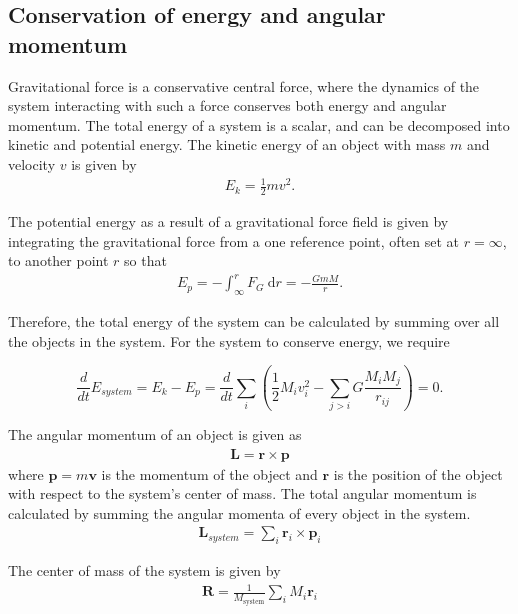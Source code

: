 \documentclass[a4paper]{article}
\begin{document}
\subsection{Conservation of energy and angular momentum}
\label{consE}
Gravitational force is a conservative central force, where the dynamics of the system interacting with such a force conserves both energy and angular momentum. The total energy of a system is a scalar, and can be decomposed into kinetic and potential energy. The kinetic energy of an object with mass $m$ and velocity $v$ is given by
\begin{align*}
 E_k = \frac{1}{2}m v^2.
\end{align*}

The potential energy as a result of a gravitational force field is given by integrating the gravitational force from a one reference point, often set at $r = \infty$, to another point $r$ so that
\begin{align*}
  \label{eq:potentialenergy}
 E_p = -\int_\infty^r F_G\: \text{d} r = -\frac{GmM}{r}.
\end{align*}

Therefore, the total energy of the system can be calculated by summing over all the objects in the system. For the system to conserve energy, we require

\begin{equation}
\frac{d}{dt}E_{system}=E_k-E_p=\frac{d}{dt}\sum_i\left( \frac{1}{2}M_{i}v_i^2 -\sum_{j>i}G\frac{M_i M_j}{r_{ij}}\right)=0.
\end{equation}

The angular momentum of an object is given as
\begin{align}
  \mathbf{L} = \mathbf{r} \times \mathbf{p}
\end{align}
where $\mathbf{p} = m \mathbf{v}$ is the momentum of the object and $\mathbf{r}$
is the position of the object with respect to the system's center of mass. The total angular momentum is calculated by summing the angular momenta of
every object in the system.
\begin{align}
  \mathbf{L}_{system} = \sum_i \mathbf{r}_{i} \times \mathbf{p}_{i}
\end{align}

The center of mass of the system is given by
\begin{align}
  \mathbf{R} = \frac{1}{M_\text{system}} \sum_i M_i \mathbf{r}_i
\end{align}

\end{document}
